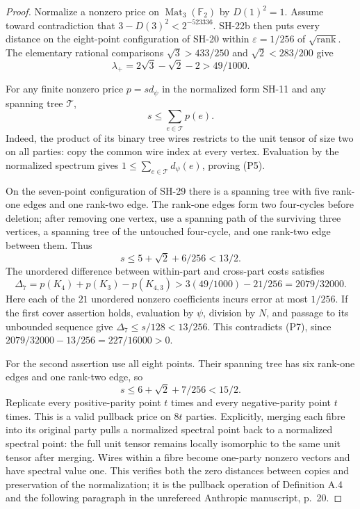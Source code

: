 \begin{proof}
Normalize a nonzero price on
$\operatorname{Mat}_3(\mathbb F_2)$ by $D(1)^2=1$.
Assume toward contradiction that
$3-D(3)^2<2^{-523336}$.  SH-22b then puts every distance
on the eight-point configuration of SH-20 within
$\varepsilon=1/256$ of $\sqrt{\operatorname{rank}}$.
The elementary rational comparisons
$\sqrt3>433/250$ and $\sqrt2<283/200$ give
\[
 \lambda_+=2\sqrt3-\sqrt2-2>49/1000.              \tag{P4}
\]

For any finite nonzero price $p=s d_\psi$ in the
normalized form SH-11 and any spanning tree $\mathcal T$,
\[
 s\le\sum_{e\in\mathcal T}p(e).                 \tag{P5}
\]
Indeed, the product of its binary tree wires restricts
to the unit tensor of size two on all parties: copy
the common wire index at every vertex.  Evaluation by
the normalized spectrum gives
$1\le\sum_{e\in\mathcal T}d_\psi(e)$, proving (P5).

On the seven-point configuration of SH-29 there is a
spanning tree with five rank-one edges and one rank-two
edge.  The rank-one edges form two four-cycles before
deletion; after removing one vertex, use a spanning
path of the surviving three vertices, a spanning tree
of the untouched four-cycle, and one rank-two edge
between them.  Thus
\[
 s\le5+\sqrt2+6/256<13/2.                       \tag{P6}
\]
The unordered difference between within-part and
cross-part costs satisfies
\[
 \Delta_7=p(K_4)+p(K_3)-p(K_{4,3})
 >3(49/1000)-21/256=2079/32000.                 \tag{P7}
\]
Here each of the $21$ unordered nonzero coefficients
incurs error at most $1/256$.
If the first cover assertion holds, evaluation by
$\psi$, division by $N$, and passage to its unbounded
sequence give
$\Delta_7\le s/128<13/256$.
This contradicts (P7), since
$2079/32000-13/256=227/16000>0$.

For the second assertion use all eight points.
Their spanning tree has six rank-one edges and one
rank-two edge, so
\[
 s\le6+\sqrt2+7/256<15/2.
\]
Replicate every positive-parity point $t$ times and
every negative-parity point $t$ times.  This is a valid
pullback price on $8t$ parties.  Explicitly, merging
each fibre into its original party pulls a normalized
spectral point back to a normalized spectral point:
the full unit tensor remains locally isomorphic to
the same unit tensor after merging.  Wires within a
fibre become one-party nonzero vectors and have
spectral value one.  This verifies both the zero
distances between copies and preservation of the
normalization; it is the pullback operation of
Definition A.4 and the following paragraph in the
unrefereed Anthropic manuscript, p.~20.


\end{proof}

